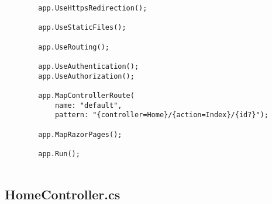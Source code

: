 \begin{verbatim}
        app.UseHttpsRedirection();
        
        app.UseStaticFiles();
        
        app.UseRouting();
        
        app.UseAuthentication();
        app.UseAuthorization();
        
        app.MapControllerRoute(
            name: "default",
            pattern: "{controller=Home}/{action=Index}/{id?}");
        
        app.MapRazorPages();
        
        app.Run();
        
\end{verbatim}

\subsection{HomeController.cs}


